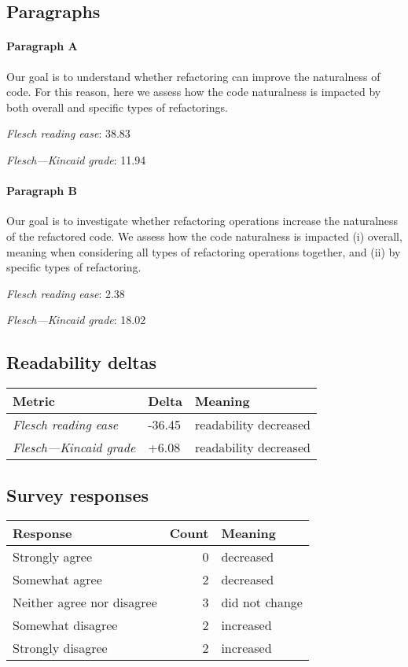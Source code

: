 \subsection{Paragraphs}
\paragraph{Paragraph A}
Our goal is to understand whether refactoring can improve the naturalness of code. For this reason, here we assess how the code naturalness is impacted by both overall and specific types of refactorings.\par\medskip
\emph{Flesch reading ease}: 38.83\par
\emph{Flesch---Kincaid grade}: 11.94

\paragraph{Paragraph B}
Our goal is to investigate whether refactoring operations increase the naturalness of the refactored code. We assess how the code naturalness is impacted (i) overall, meaning when considering all types of refactoring operations together, and (ii) by specific types of refactoring.\par\medskip
\emph{Flesch reading ease}: 2.38\par
\emph{Flesch---Kincaid grade}: 18.02

\subsection{Readability deltas}

\begin{tabular}{lll}
\toprule
               \textbf{Metric} & \textbf{Delta} &       \textbf{Meaning} \\
\midrule
    \emph{Flesch reading ease} &         -36.45 &  readability decreased \\
 \emph{Flesch---Kincaid grade} &          +6.08 &  readability decreased \\
\bottomrule
\end{tabular}

\subsection{Survey responses}
\begin{tabular}{lrl}
\toprule
          \textbf{Response} &  \textbf{Count} & \textbf{Meaning} \\
\midrule
             Strongly agree &               0 &        decreased \\
             Somewhat agree &               2 &        decreased \\
 Neither agree nor disagree &               3 &   did not change \\
          Somewhat disagree &               2 &        increased \\
          Strongly disagree &               2 &        increased \\
\bottomrule
\end{tabular}

